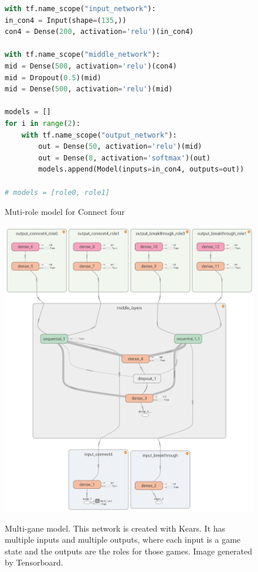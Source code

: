 \documentclass[twocolumn, letterpaper, 10 pt, conference]{ieeeconf}  %
\begin{document}
\begin{figure}
    \caption{Muti-role model for Connect four}
    \begin{lstlisting}[language=Python, frame=single]
with tf.name_scope("input_network"):
in_con4 = Input(shape=(135,))
con4 = Dense(200, activation='relu')(in_con4)

with tf.name_scope("middle_network"):
mid = Dense(500, activation='relu')(con4)
mid = Dropout(0.5)(mid)
mid = Dense(500, activation='relu')(mid)

models = []
for i in range(2):
    with tf.name_scope("output_network"):
        out = Dense(50, activation='relu')(mid)
        out = Dense(8, activation='softmax')(out) 
        models.append(Model(inputs=in_con4, outputs=out))

# models = [role0, role1]
    \end{lstlisting}
    \label{fig:multi_role_model_code}
\end{figure}
\begin{figure}
    \centering
    \caption{Multi-gane model. This network is created with Kears. It has multiple inputs and multiple outputs, where each input is a game state and the outputs are the roles for those games. Image generated by Tensorboard. }
    \includegraphics[scale=0.75]{Images/multiple_games_expanded.png}
    \label{fig:multi_game_model}
\end{figure}
\end{document}
